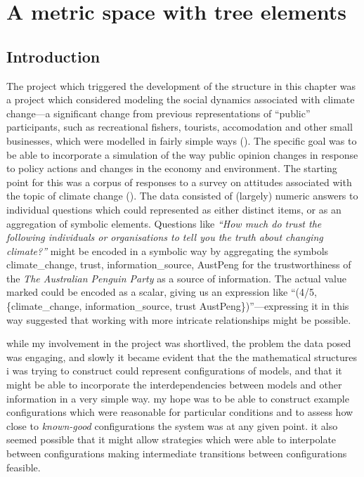 \chapter[A METRIC SPACE WITH TREE ELEMENTS] {A metric space with tree elements}\label{treering}
\WeAreOn{\cfour}

\section{Introduction}
The project which triggered the development of the structure in this
chapter was a project which considered modeling the social dynamics
associated with climate change---a significant change from previous
representations of ``public'' participants, such as recreational
fishers, tourists, accomodation and other small businesses, which were
modelled in fairly simple ways (\cite{Fulton2011ningaloo,Gray2014}).
The specific goal was to be able to incorporate a simulation of the
way public opinion changes in response to policy actions and changes
in the economy and environment.  The starting point for this was a
corpus of responses to a survey on attitudes associated with the topic
of climate change (\cite{boschetti2012}). The data consisted of
(largely) numeric answers to individual questions which could
represented as either distinct items, or as an aggregation of symbolic
elements.  Questions like \textsl{``How much do trust the following
  individuals or organisations to tell you the truth about changing
  climate?''\/} might be encoded in a symbolic way by aggregating the
symbols \textsf{climate\_change, trust, information\_source, AustPeng}
for the trustworthiness of the \emph{The Australian Penguin Party\/}
as a source of information. The actual value marked could be encoded
as a scalar, giving us an expression like ``(\textsf{4/5,
  \{climate\_change, information\_source, trust
  AustPeng\}})''---expressing it in this way suggested that working
with more intricate relationships might be possible.

while my involvement in the project was shortlived, the problem the
data posed was engaging, and slowly it became evident that the the
mathematical structures i was trying to construct could represent
configurations of models, and that it might be able to incorporate the
interdependencies between models and other information in a very
simple way.  my hope was to be able to construct example
configurations which were reasonable for particular conditions and to
assess how close to \emph{known-good} configurations the system was at
any given point.  it also seemed possible that it might allow
strategies which were able to interpolate between configurations
making intermediate transitions between configurations feasible.

